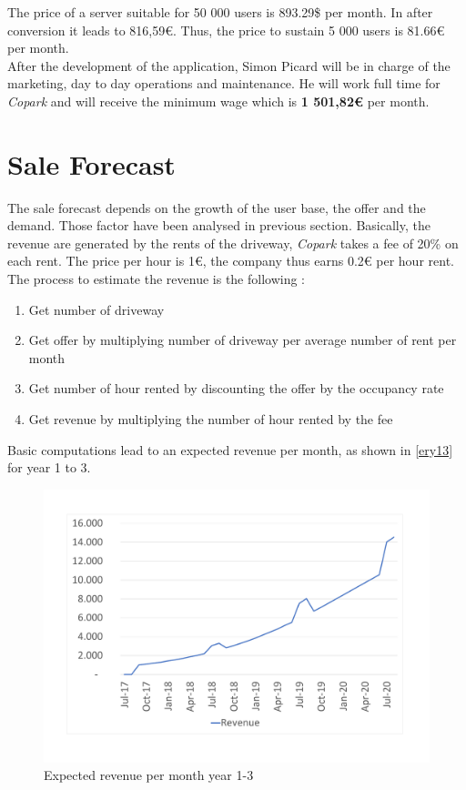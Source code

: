 \documentclass[12pt,a4paper,oneside]{book}
\newcommand{\bp}{\textit{Copark }}
\begin{document}
The price of a server suitable for 50 000 users is 893.29\$ per month.\cite{awsclwa} In after conversion it leads to 816,59\euro{}. Thus, the price to sustain 5 000 users is 81.66\euro{} per month.\\

After the development of the application, Simon Picard will be in charge of the marketing, day to day operations and maintenance. He will work full time for \bp and will receive the minimum wage which is \textbf{1 501,82\euro{}} per month.\cite{eurostatmw}\\


\section{Sale Forecast}
\label{sf}

The sale forecast depends on the growth of the user base, the offer and the demand. Those factor have been analysed in previous section. Basically, the revenue are generated by the rents of the driveway, \bp takes a fee of 20\% on each rent. The price per hour is 1\euro{}, the company thus earns 0.2\euro{} per hour rent.\\

The process to estimate the revenue is the following :
\begin{enumerate}
\item Get number of driveway
\item Get offer by multiplying number of driveway per average number of rent per month
\item Get number of hour rented by discounting the offer by the occupancy rate
\item Get revenue by multiplying the number of hour rented by the fee
\end{enumerate}

Basic computations lead to an expected revenue per month, as shown in \autoref{ery13} for year 1 to 3.\\

\begin{figure}[h]
\centering
\caption{Expected revenue per month year 1-3}
\label{ery13}
\includegraphics[keepaspectratio=true,width=\textwidth-2cm]{../graph/expectedrev.pdf}
\end{figure}
\end{document}
